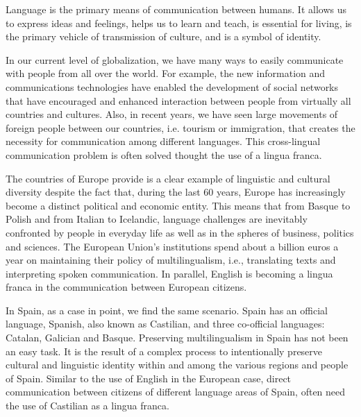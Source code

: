 \cleardoublepage




\begin{multicols}{2}
    
Language is the primary means of communication between humans. It allows us to express ideas and feelings, helps us to learn and teach, is essential for living, is the primary vehicle of transmission of culture, and is a symbol of identity.

    
In our current level of globalization, we have many ways to easily communicate with people from all over the world. For example, the new information and communications technologies have enabled the development of social networks that have encouraged and enhanced interaction between people from virtually all countries and cultures. Also, in recent years, we have seen large movements of foreign people between our countries, i.e. tourism or immigration, that creates the necessity for communication among different languages. This cross-lingual communication problem is often solved thought the use of a lingua franca.

The countries of Europe provide is a clear example of linguistic and cultural diversity despite the fact that, during the last 60 years, Europe has increasingly become a distinct political and economic entity. This means that from Basque to Polish and from Italian to Icelandic, language challenges are inevitably confronted by people in everyday life as well as in the spheres of business, politics and sciences. The European Union’s institutions spend about a billion euros a year on maintaining their policy of multilingualism, i.e., translating texts and interpreting spoken communication. In parallel, English is becoming a lingua franca in the communication between European citizens.

In Spain, as a case in point, we find the same scenario. Spain has an official language, Spanish, also known as Castilian, and three co-official languages: Catalan, Galician and Basque. Preserving multilingualism in Spain has not been an easy task. It is the result of a complex process to intentionally preserve cultural and linguistic identity within and among the various regions and people of Spain. Similar to the use of English in the European case, direct communication between citizens of different language areas of Spain, often need the use of Castilian as a lingua franca.


\end{multicols}
